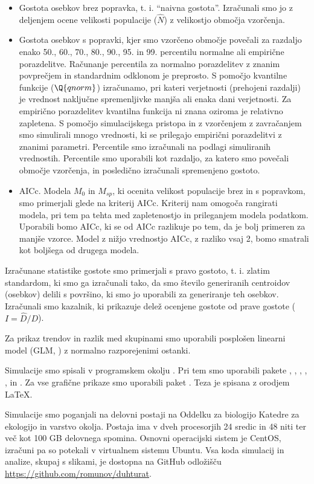 \begin{itemize}
  \item Gostota osebkov brez popravka, t. i. ``naivna gostota''. Izračunali smo jo z deljenjem ocene velikosti populacije ($\hat{N}$) z velikostjo območja vzorčenja.
  \item Gostota osebkov s popravki, kjer smo vzorčeno območje povečali za razdaljo enako 50., 60., 70., 80., 90., 95. in 99. percentilu normalne ali empirične porazdelitve.
Računanje percentila za normalno porazdelitev z znanim povprečjem in standardnim odklonom je preprosto. S pomočjo kvantilne funkcije ($\Q{qnorm}$) izračunamo, pri kateri verjetnosti (prehojeni razdalji) je vrednost naključne spremenljivke manjša ali enaka dani verjetnosti.
Za empirično porazdelitev kvantilna funkcija ni znana oziroma je relativno zapletena. S pomočjo simulacijskega pristopa in z vzorčenjem z zavračanjem smo simulirali mnogo vrednosti, ki se prilegajo empirični porazdelitvi z znanimi parametri. Percentile smo izračunali na podlagi simuliranih vrednostih. Percentile smo uporabili kot razdaljo, za katero smo povečali območje vzorčenja, in posledično izračunali spremenjeno gostoto.
  \item AICc. Modela $M_0$ in $M_{sp}$, ki ocenita velikost populacije brez in s popravkom, smo primerjali glede na kriterij AICc. Kriterij nam omogoča rangirati modela, pri tem pa tehta med zapletenostjo in prileganjem modela podatkom. Uporabili bomo AICc, ki se od AICc razlikuje po tem, da je bolj primeren za manjše vzorce. Model z nižjo vrednostjo AICc, z razliko vsaj 2, bomo smatrali kot boljšega od drugega modela.
\end{itemize}

Izračunane statistike gostote smo primerjali s pravo gostoto, t. i. zlatim standardom, ki smo ga izračunali tako, da smo število generiranih centroidov (osebkov) delili s površino, ki smo jo uporabili za generiranje teh osebkov. Izračunali smo kazalnik, ki prikazuje delež ocenjene gostote od prave gostote ($I = \hat{D}/D$).

Za prikaz trendov in razlik med skupinami smo uporabili posplošen linearni model (GLM, \citet{faraway_extending_2006}) z normalno razporejenimi ostanki.

Simulacije smo spisali v programskem okolju  \citep{r_core_team_r_2018}. Pri tem smo uporabili pakete  \citep{bivand_applied_2008},  \citep{hijmans_ability_2006},  \citep{bivand_rundel_2017},  \citep{maechler_et_al_2018},  \citep{rowlingson_diggle_2017},  \citep{microsoft_2017} in  \citep{doparallel_2017}. Za vse grafične prikaze smo uporabili paket  \citep{wickham_ggplot2_2009}. Teza je spisana z orodjem \LaTeX.

Simulacije smo poganjali na delovni postaji na Oddelku za biologijo Katedre za ekologijo in varstvo okolja. Postaja ima v dveh procesorjih 24 sredic in 48 niti ter več kot 100 GB delovnega spomina. Osnovni operacijski sistem je CentOS, izračuni pa so potekali v virtualnem sistemu Ubuntu. Vsa koda simulacij in analize, skupaj s slikami, je dostopna na GitHub odložišču \url{https://github.com/romunov/duhturat}.
